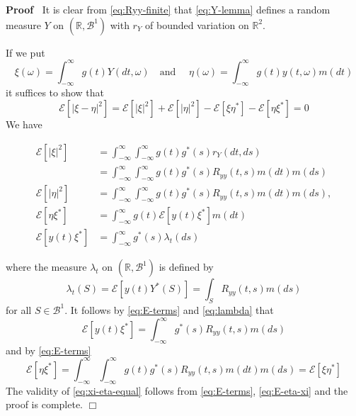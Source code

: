 \documentclass{article}
\newenvironment{proof}{\noindent\textbf{Proof\ }}{\hspace*{\fill}$\Box$\medskip}
\begin{document}
\begin{proof}
  It is clear from \eqref{eq:Ryy-finite} that \eqref{eq:Y-lemma} defines a
  random measure $Y$ on $(\mathbb{R}, \mathscr{B}^1)$ with $r_Y$ of bounded
  variation on $\mathbb{R}^2$.
  
  If we put
  \begin{equation}
    \xi (\omega) = \int_{- \infty}^{\infty} g (t) Y (dt, \omega)  \quad
    \text{and } \quad \eta (\omega) = \int_{- \infty}^{\infty} g (t) y (t,
    \omega) m (dt) \label{eq:xi-eta}
  \end{equation}
  it suffices to show that
  \begin{equation}
    \mathscr{E} [| \xi - \eta |^2] = \mathscr{E} [| \xi |^2] + \mathscr{E} [|
    \eta |^2] - \mathscr{E} [\xi \eta^{\ast}] - \mathscr{E} [\eta \xi^{\ast}]
    = 0 \label{eq:xi-eta-equal}
  \end{equation}
  We have
  
  \begin{align}
    \mathscr{E} [| \xi |^2] & = \int_{- \infty}^{\infty} \int_{-
    \infty}^{\infty} g (t) g^{\ast} (s) r_Y (dt, ds) \\
    & = \int_{- \infty}^{\infty} \int_{- \infty}^{\infty} g (t) g^{\ast} (s)
    R_{yy} (t, s) m (dt) m (ds) \\
    \mathscr{E} [| \eta |^2] & = \int_{- \infty}^{\infty} \int_{-
    \infty}^{\infty} g (t) g^{\ast} (s) R_{yy} (t, s) m (dt) m (ds), \\
    \mathscr{E} [\eta \xi^{\ast}] & = \int_{- \infty}^{\infty} g (t)
    \mathscr{E} [y (t) \xi^{\ast}] m (dt) \\
    \mathscr{E} [y (t) \xi^{\ast}] & = \int_{- \infty}^{\infty} g^{\ast} (s)
    \lambda_t  (ds)  \label{eq:E-terms}
  \end{align}
  
  where the measure $\lambda_t$ on $(\mathbb{R}, \mathscr{B}^1)$ is defined by
  \begin{equation}
    \lambda_t (S) = \mathscr{E} [y (t) Y^{\ast} (S)] = \int_S R_{yy} (t, s) m
    (ds) \label{eq:lambda}
  \end{equation}
  for all $S \in \mathscr{B}^1$. It follows by \eqref{eq:E-terms} and
  \eqref{eq:lambda} that
  \begin{equation}
    \mathscr{E} [y (t) \xi^{\ast}] = \int_{- \infty}^{\infty} g^{\ast} (s)
    R_{yy} (t, s) m (ds) \label{eq:E-y-xi}
  \end{equation}
  and by \eqref{eq:E-terms}
  \begin{equation}
    \mathscr{E} [\eta \xi^{\ast}] = \int_{- \infty}^{\infty} \int_{-
    \infty}^{\infty} g (t) g^{\ast} (s) R_{yy} (t, s) m (dt) m (ds) =
    \mathscr{E} [\xi \eta^{\ast}] \label{eq:E-eta-xi}
  \end{equation}
  The validity of \eqref{eq:xi-eta-equal} follows from \eqref{eq:E-terms},
  \eqref{eq:E-eta-xi} and the proof is complete.
\end{proof}
\end{document}
